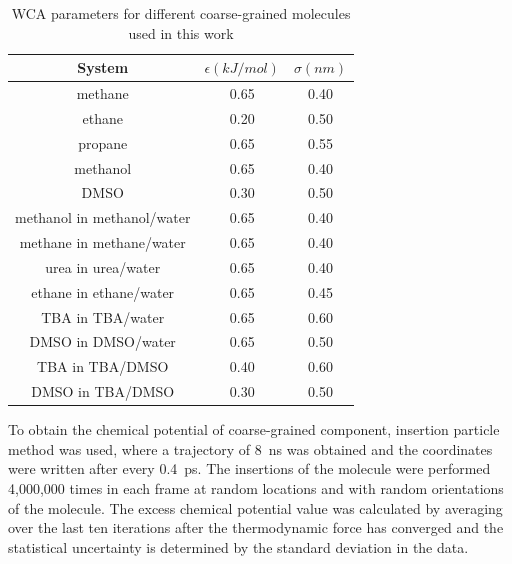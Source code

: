 \documentclass[a4paper,preprint,unsortedaddress]{revtex4-1}
\newcommand{\recheck}[1]{{\color{red} #1}}
\begin{document}
\begin{table}[]
\begin{center}
\begin{tabular}{ccc}
\hline \hline
 System & $\epsilon (kJ/mol)$ & $\sigma (nm)$ \\
\hline
methane & 0.65 & 0.40 \\
ethane & 0.20 & 0.50 \\
propane & 0.65 & 0.55 \\
methanol & 0.65 & 0.40 \\
DMSO & 0.30 & 0.50 \\
methanol in methanol/water & 0.65 & 0.40 \\
methane in methane/water & 0.65 & 0.40 \\
urea in urea/water & 0.65 & 0.40 \\
ethane in ethane/water & 0.65 & 0.45 \\
TBA in TBA/water & 0.65 & 0.60\\
DMSO in DMSO/water & 0.65 & 0.50 \\
TBA in TBA/DMSO & 0.40 & 0.60 \\
DMSO in TBA/DMSO & 0.30 & 0.50 \\
\hline \hline
\end{tabular}
\caption{WCA parameters for different coarse-grained molecules used in this work}
\label{cg}
\end{center}
\end{table}



To obtain the chemical potential of coarse-grained component, 
insertion particle method was used, where a trajectory of 8~ns was obtained and the coordinates were written
after every 0.4~ps. The insertions of the molecule were performed 4,000,000 times in each 
frame at random locations and with random orientations of the molecule.  
\recheck{The excess chemical potential value was calculated by averaging over the last ten iterations after 
the thermodynamic force has converged and the statistical uncertainty is determined by the standard deviation in the data. \\}
\end{document}
